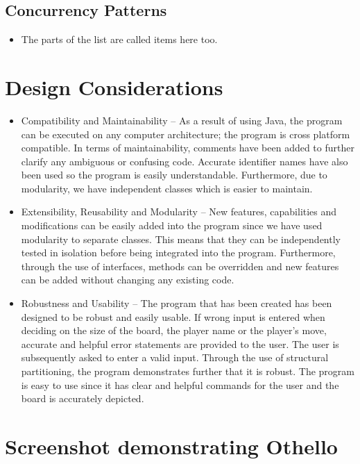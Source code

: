 \documentclass[a4wide, 11pt]{article}
\begin{document}
\subsection{Concurrency Patterns}
\begin{itemize}

    \item
    The parts of the list are called items here too.
    
\end{itemize}

\section{Design Considerations}

\begin{itemize}

    \item Compatibility and Maintainability – As a result of using Java, the program can be executed on any computer architecture; the program is cross platform compatible. In terms of maintainability, comments have been added to further clarify any ambiguous or confusing code. Accurate identifier names have also been used so the program is easily understandable. Furthermore, due to modularity, we have independent classes which is easier to maintain.

   \item Extensibility, Reusability and Modularity – New features, capabilities and modifications can be easily added into the program since we have used modularity to separate classes. This means that they can be independently tested in isolation before being integrated into the program. Furthermore, through the use of interfaces, methods can be overridden and new features can be added without changing any existing code. 

   \item Robustness and Usability – The program that has been created has been designed to be robust and easily usable. If wrong input is entered when deciding on the size of the board, the player name or the player's move, accurate and helpful error statements are provided to the user. The user is subsequently asked to enter a valid input. Through the use of structural partitioning, the program demonstrates further that it is robust. The program is easy to use since it has clear and helpful commands for the user and the board is accurately depicted. 
 
\end{itemize}

\section{Screenshot demonstrating Othello}
\end{document}

